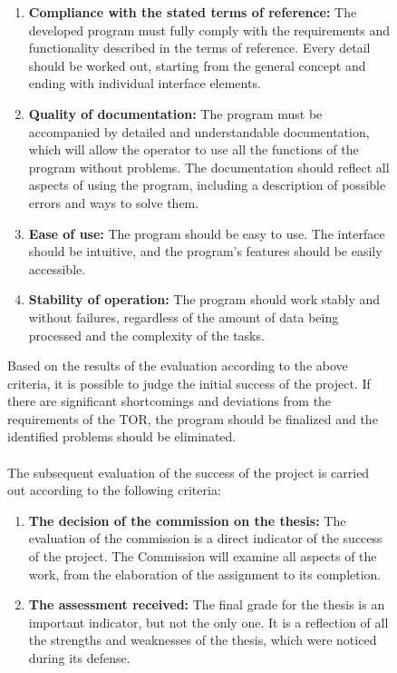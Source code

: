 \documentclass{article}
\begin{document}
\begin{figure}[!t]
\begin{minipage}{0.49\textwidth}
            \begin{enumerate}
                \item \textbf{Compliance with the stated terms of reference:} The developed program must fully comply with the requirements and functionality described in the terms of reference. Every detail should be worked out, starting from the general concept and ending with individual interface elements.
                \item \textbf{Quality of documentation:} The program must be accompanied by detailed and understandable documentation, which will allow the operator to use all the functions of the program without problems. The documentation should reflect all aspects of using the program, including a description of possible errors and ways to solve them.
                \item \textbf{Ease of use:} The program should be easy to use. The interface should be intuitive, and the program's features should be easily accessible.
                \item \textbf{Stability of operation:} The program should work stably and without failures, regardless of the amount of data being processed and the complexity of the tasks.
            \end{enumerate}
            Based on the results of the evaluation according to the above criteria, it is possible to judge the initial success of the project. If there are significant shortcomings and deviations from the requirements of the TOR, the program should be finalized and the identified problems should be eliminated.\\
            ~\\
            The subsequent evaluation of the success of the project is carried out according to the following criteria:
            \begin{enumerate}
                \item \textbf{The decision of the commission on the thesis:} The evaluation of the commission is a direct indicator of the success of the project. The Commission will examine all aspects of the work, from the elaboration of the assignment to its completion.

                \item \textbf{The assessment received:} The final grade for the thesis is an important indicator, but not the only one. It is a reflection of all the strengths and weaknesses of the thesis, which were noticed during its defense.


\end{enumerate}
\end{minipage}
\end{figure}
\end{document}

